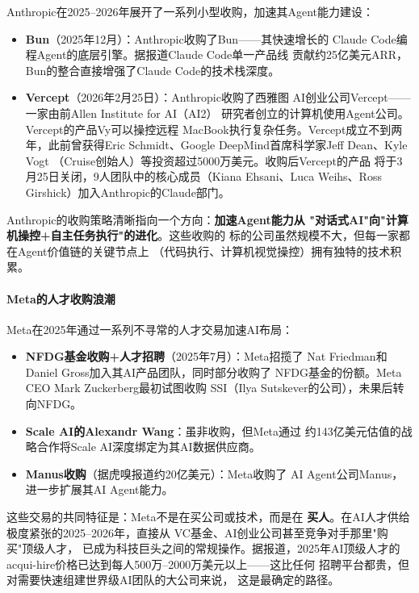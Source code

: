 Anthropic在2025--2026年展开了一系列小型收购，加速其Agent能力建设：
\begin{itemize}
  \item \textbf{Bun}（2025年12月）：Anthropic收购了Bun——其快速增长的
    Claude Code编程Agent的底层引擎。据报道Claude Code单一产品线
    贡献约25亿美元ARR，Bun的整合直接增强了Claude Code的技术栈深度。
  \item \textbf{Vercept}（2026年2月25日）：Anthropic收购了西雅图
    AI创业公司Vercept——一家由前Allen Institute for AI（AI2）
    研究者创立的计算机使用Agent公司。Vercept的产品Vy可以操控远程
    MacBook执行复杂任务。Vercept成立不到两年，此前曾获得Eric
    Schmidt、Google DeepMind首席科学家Jeff Dean、Kyle Vogt
    （Cruise创始人）等投资超过5000万美元。收购后Vercept的产品
    将于3月25日关闭，9人团队中的核心成员（Kiana Ehsani、Luca
    Weihs、Ross Girshick）加入Anthropic的Claude部门。
\end{itemize}

Anthropic的收购策略清晰指向一个方向：\textbf{加速Agent能力从
"对话式AI"向"计算机操控+自主任务执行"的进化}。这些收购的
标的公司虽然规模不大，但每一家都在Agent价值链的关键节点上
（代码执行、计算机视觉操控）拥有独特的技术积累。

\paragraph{Meta的人才收购浪潮}

Meta在2025年通过一系列不寻常的人才交易加速AI布局：
\begin{itemize}
  \item \textbf{NFDG基金收购+人才招聘}（2025年7月）：Meta招揽了
    Nat Friedman和Daniel Gross加入其AI产品团队，同时部分收购了
    NFDG基金的份额。Meta CEO Mark Zuckerberg最初试图收购
    SSI（Ilya Sutskever的公司），未果后转向NFDG。
  \item \textbf{Scale AI的Alexandr Wang}：虽非收购，但Meta通过
    约143亿美元估值的战略合作将Scale AI深度绑定为其AI数据供应商。
  \item \textbf{Manus收购}（据虎嗅报道约20亿美元）：Meta收购了
    AI Agent公司Manus，进一步扩展其AI Agent能力。
\end{itemize}

这些交易的共同特征是：Meta不是在买公司或技术，而是在
\textbf{买人}。在AI人才供给极度紧张的2025--2026年，直接从
VC基金、AI创业公司甚至竞争对手那里"购买"顶级人才，
已成为科技巨头之间的常规操作。据报道，2025年AI顶级人才的
acqui-hire价格已达到每人500万--2000万美元以上——这比任何
招聘平台都贵，但对需要快速组建世界级AI团队的大公司来说，
这是最确定的路径。

